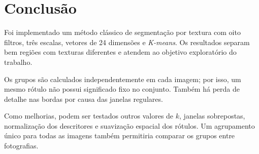 \section{Conclusão}

Foi implementado um método clássico de segmentação por textura com oito filtros, três escalas, vetores de 24 dimensões e \textit{K-means}. Os resultados separam bem regiões com texturas diferentes e atendem ao objetivo exploratório do trabalho.

Os grupos são calculados independentemente em cada imagem; por isso, um mesmo rótulo não possui significado fixo no conjunto. Também há perda de detalhe nas bordas por causa das janelas regulares.

Como melhorias, podem ser testados outros valores de $k$, janelas sobrepostas, normalização dos descritores e suavização espacial dos rótulos. Um agrupamento único para todas as imagens também permitiria comparar os grupos entre fotografias.

